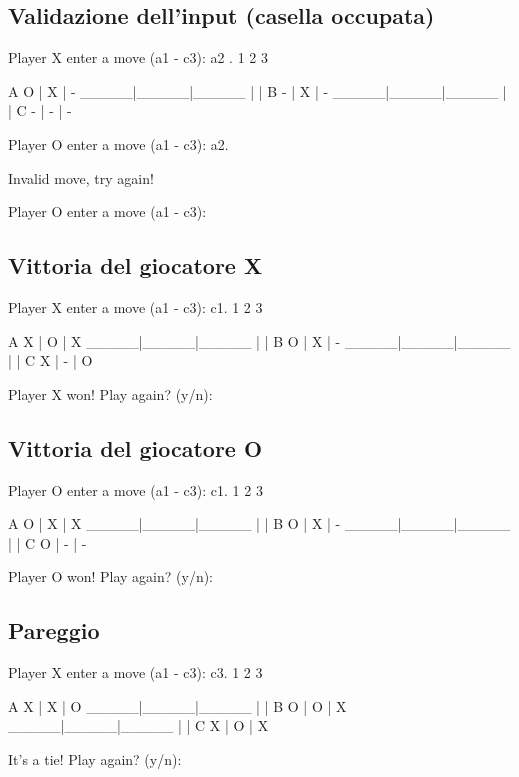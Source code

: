 \documentclass{article}
\begin{document}
\subsection{Validazione dell'input (casella occupata)}
    \begin{spverbatim}
    Player X enter a move (a1 - c3): a2
    .
         1     2     3

    A    O  |  X  |  -  
       _____|_____|_____
            |     |     
    B    -  |  X  |  -  
       _____|_____|_____
            |     |     
    C    -  |  -  |  -  

    Player O enter a move (a1 - c3): a2.

    Invalid move, try again!

    Player O enter a move (a1 - c3): 
    \end{spverbatim}

\subsection{Vittoria del giocatore X}
    \begin{spverbatim}
    Player X enter a move (a1 - c3): c1.
         1     2     3

    A    X  |  O  |  X  
       _____|_____|_____
            |     |     
    B    O  |  X  |  -  
       _____|_____|_____
            |     |     
    C    X  |  -  |  O  

    Player X won!
    Play again? (y/n): 
    \end{spverbatim}

\subsection{Vittoria del giocatore O}
    \begin{spverbatim}
    Player O enter a move (a1 - c3): c1.
         1     2     3

    A    O  |  X  |  X  
       _____|_____|_____
            |     |     
    B    O  |  X  |  -  
       _____|_____|_____
            |     |     
    C    O  |  -  |  -  

    Player O won!
    Play again? (y/n): 
    \end{spverbatim}

\subsection{Pareggio}
    \begin{spverbatim}
    Player X enter a move (a1 - c3): c3.
         1     2     3

    A    X  |  X  |  O  
       _____|_____|_____
            |     |     
    B    O  |  O  |  X  
       _____|_____|_____
            |     |     
    C    X  |  O  |  X  

    It's a tie!
    Play again? (y/n): 
    \end{spverbatim}
\end{document}
